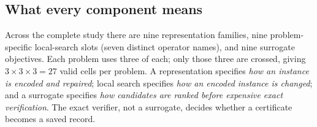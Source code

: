 \documentclass[11pt]{article}
\begin{document}
\subsection{What every component means}

Across the complete study there are nine representation families, nine
problem-specific local-search slots (seven distinct operator names), and nine
surrogate objectives.  Each problem uses three of each; only those three are
crossed, giving $3\times3\times3=27$
valid cells per problem.  A representation specifies \emph{how an instance is
encoded and repaired}; local search specifies \emph{how an encoded instance is
changed}; and a surrogate specifies \emph{how candidates are ranked before
expensive exact verification}.  The exact verifier, not a surrogate, decides
whether a certificate becomes a saved record.
\end{document}
